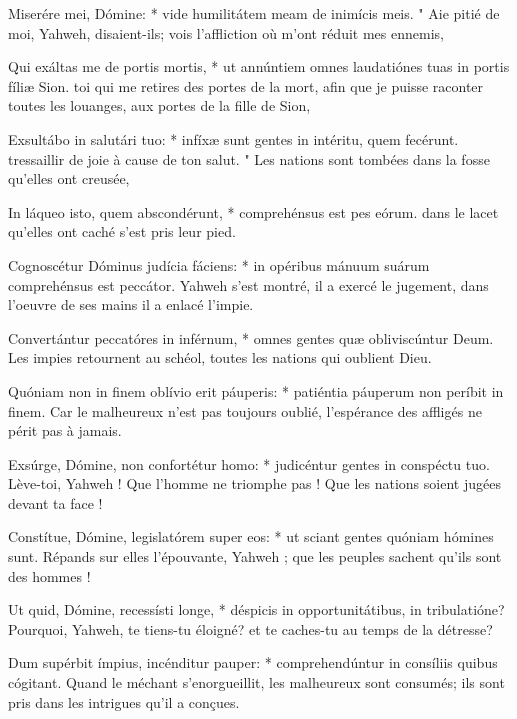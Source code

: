 \begin{paracol}{2}

\LigneParacol
{Miserére mei, Dómine: * vide humilitátem meam de inimícis meis.}
{" Aie pitié de moi, Yahweh, disaient-ils; vois l'affliction où m'ont réduit mes ennemis,}

\LigneParacol
{Qui exáltas me de portis mortis, * ut annúntiem omnes laudatiónes tuas in portis fíliæ Sion.}
{toi qui me retires des portes de la mort, afin que je puisse raconter toutes les louanges, aux portes de la fille de Sion,}

\LigneParacol
{Exsultábo in salutári tuo: * infíxæ sunt gentes in intéritu, quem fecérunt.}
{tressaillir de joie à cause de ton salut. " Les nations sont tombées dans la fosse qu'elles ont creusée,}

\LigneParacol
{In láqueo isto, quem abscondérunt, * comprehénsus est pes eórum.}
{dans le lacet qu'elles ont caché s'est pris leur pied.}

\LigneParacol
{Cognoscétur Dóminus judícia fáciens: * in opéribus mánuum suárum comprehénsus est peccátor.}
{Yahweh s'est montré, il a exercé le jugement, dans l'oeuvre de ses mains il a enlacé l'impie.}

\LigneParacol
{Convertántur peccatóres in inférnum, * omnes gentes quæ obliviscúntur Deum.}
{Les impies retournent au schéol, toutes les nations qui oublient Dieu.}

\LigneParacol
{Quóniam non in finem oblívio erit páuperis: * patiéntia páuperum non períbit in finem.}
{Car le malheureux n'est pas toujours oublié, l'espérance des affligés ne périt pas à jamais. }

\LigneParacol
{Exsúrge, Dómine, non confortétur homo: * judicéntur gentes in conspéctu tuo.}
{Lève-toi, Yahweh ! Que l'homme ne triomphe pas ! Que les nations soient jugées devant ta face ! }

\LigneParacol
{Constítue, Dómine, legislatórem super eos: * ut sciant gentes quóniam hómines sunt.}
{Répands sur elles l'épouvante, Yahweh ; que les peuples sachent qu'ils sont des hommes !}

\LigneParacol
{Ut quid, Dómine, recessísti longe, * déspicis in opportunitátibus, in tribulatióne?}
{Pourquoi, Yahweh, te tiens-tu éloigné? et te caches-tu au temps de la détresse? }

\LigneParacol
{Dum supérbit ímpius, incénditur pauper: * comprehendúntur in consíliis quibus cógitant.}
{Quand le méchant s'enorgueillit, les malheureux sont consumés; ils sont pris dans les intrigues qu'il a conçues. }


\end{paracol}
